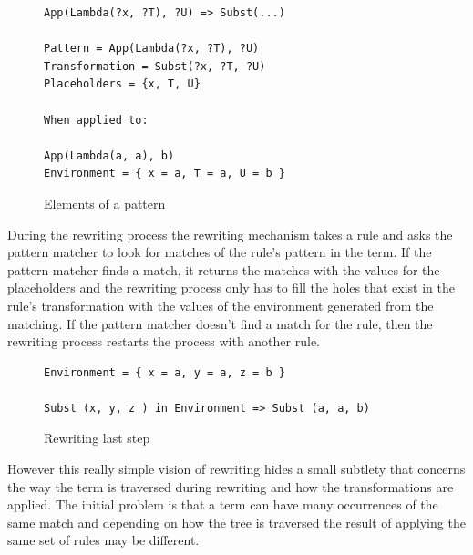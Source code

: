 \documentclass[12pt,a4paper]{article}
\begin{document}
\begin{figure}
\begin{verbatim}
App(Lambda(?x, ?T), ?U) => Subst(...)

Pattern = App(Lambda(?x, ?T), ?U)
Transformation = Subst(?x, ?T, ?U)
Placeholders = {x, T, U}

When applied to:

App(Lambda(a, a), b)
Environment = { x = a, T = a, U = b }

\end{verbatim}
\caption{Elements of a pattern}
\end{figure}


During the rewriting process the rewriting mechanism takes a rule and 
asks the pattern matcher to look for matches of the rule's pattern in the term. 
If the pattern matcher finds a match, it
returns the matches with the values for the placeholders and
the rewriting process only has to fill the holes that exist in the rule's
transformation with the values of the environment generated from the matching. If the
pattern matcher doesn't find a match for the rule, then the rewriting process restarts
the process with another rule.



\begin{figure}
\begin{verbatim}
Environment = { x = a, y = a, z = b }

Subst (x, y, z ) in Environment => Subst (a, a, b) 

\end{verbatim}
\caption{Rewriting last step}
\end{figure}

However this really simple vision of rewriting hides a small subtlety
that concerns the way the term is traversed during rewriting
and how the transformations are applied. The initial problem is that
a term can have many occurrences of the same match and depending on
how the tree is traversed the result of applying the same set of rules
may be different.
\end{document}
